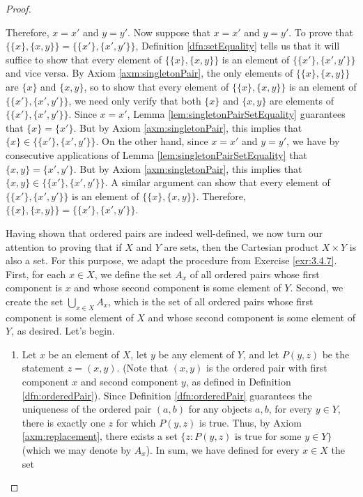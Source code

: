 \documentclass[../main.tex]{subfiles}
\begin{document}
\begin{enumerate}[ref={\thesection.\arabic*}]
\begin{proof}
\begin{enumerate}[label={(\arabic*)}]
        \end{enumerate}
        Therefore, $x=x'$ and $y=y'$. Now suppose that $x=x'$ and $y=y'$. To prove that $\{\{x\},\{x,y\}\}=\{\{x'\},\{x',y'\}\}$, Definition \ref{dfn:setEquality} tells us that it will suffice to show that every element of $\{\{x\},\{x,y\}\}$ is an element of $\{\{x'\},\{x',y'\}\}$ and vice versa. By Axiom \ref{axm:singletonPair}, the only elements of $\{\{x\},\{x,y\}\}$ are $\{x\}$ and $\{x,y\}$, so to show that every element of $\{\{x\},\{x,y\}\}$ is an element of $\{\{x'\},\{x',y'\}\}$, we need only verify that both $\{x\}$ and $\{x,y\}$ are elements of $\{\{x'\},\{x',y'\}\}$. Since $x=x'$, Lemma \ref{lem:singletonPairSetEquality} guarantees that $\{x\}=\{x'\}$. But by Axiom \ref{axm:singletonPair}, this implies that $\{x\}\in\{\{x'\},\{x',y'\}\}$. On the other hand, since $x=x'$ and $y=y'$, we have by consecutive applications of Lemma \ref{lem:singletonPairSetEquality} that $\{x,y\}=\{x',y'\}$. But by Axiom \ref{axm:singletonPair}, this implies that $\{x,y\}\in\{\{x'\},\{x',y'\}\}$. A similar argument can show that every element of $\{\{x'\},\{x',y'\}\}$ is an element of $\{\{x\},\{x,y\}\}$. Therefore, $\{\{x\},\{x,y\}\}=\{\{x'\},\{x',y'\}\}$.\par
        \medskip
        Having shown that ordered pairs are indeed well-defined, we now turn our attention to proving that if $X$ and $Y$ are sets, then the Cartesian product $X\times Y$ is also a set. For this purpose, we adapt the procedure from Exercise \ref{exr:3.4.7}. First, for each $x\in X$, we define the set $A_x$ of all ordered pairs whose first component is $x$ and whose second component is some element of $Y$. Second, we create the set $\bigcup_{x\in X}A_x$, which is the set of all ordered pairs whose first component is some element of $X$ and whose second component is some element of $Y$, as desired. Let's begin.
        \begin{enumerate}[label={(\arabic*)}]
            \item Let $x$ be an element of $X$, let $y$ be any element of $Y$, and let $P(y,z)$ be the statement $z=(x,y)$. (Note that $(x,y)$ is the ordered pair with first component $x$ and second component $y$, as defined in Definition \ref{dfn:orderedPair}). Since Definition \ref{dfn:orderedPair} guarantees the uniqueness of the ordered pair $(a,b)$ for any objects $a,b$, for every $y\in Y$, there is exactly one $z$ for which $P(y,z)$ is true. Thus, by Axiom \ref{axm:replacement}, there exists a set $\{z:P(y,z)\text{ is true for some }y\in Y\}$ (which we may denote by $A_x$). In sum, we have defined for every $x\in X$ the set

\end{enumerate}
\end{proof}
\end{enumerate}
\end{document}

